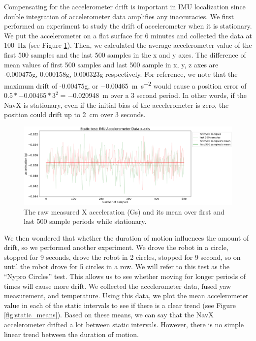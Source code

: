 \documentclass{article}
\begin{document}
      Compensating for the accelerometer drift is important in IMU localization since double integration of accelerometer data amplifies any inaccuracies. We first performed an experiment to study the drift of accelerometer when it is stationary. We put the accelerometer on a flat surface for 6 minutes and collected the data at \SI{100}{\hertz} (see Figure \ref{fig:static_test}). Then, we calculated the average accelerometer value of the first 500 samples and the last 500 samples in the x and y axes. The difference of mean values of first 500 samples and last 500 sample in x, y, z axes are -0.000475g, 0.000158g, 0.000323g respectively. For reference, we note that the maximum drift of -0.00475g, or \SI{-0.00465}{\meter\per\second\squared} would cause a position error of $0.5*-0.00465*3^2=$\SI{-0.020948}{\meter} over a 3 second period. In other words, if the NavX is stationary, even if the initial bias of the accelerometer is zero, the position could drift up to \SI{2}{\centi\meter} over 3 seconds.

      \begin{figure}[H]
        \centering
        \includegraphics[width=1\linewidth]{./images/static_test.png}
        \caption{The raw measured X acceleration (Gs) and its mean over first and last 500 sample periods while stationary.}
        \label{fig:static_test}
      \end{figure}

      We then wondered that whether the duration of motion influences the amount of drift, so we performed another experiment. We drove the robot in a circle, stopped for 9 seconds, drove the robot in 2 circles, stopped for 9 second, so on until the robot drove for 5 circles in a row. We will refer to this test as the ``Nypro Circles'' test. This allows us to see whether moving for longer periods of times will cause more drift. We collected the accelerometer data, fused yaw measurement, and temperature. Using this data, we plot the mean accelerometer value in each of the static intervals to see if there is a clear trend (see Figure \ref{fig:static_means}). Based on these means, we can say that the NavX accelerometer drifted a lot between static intervals. However, there is no simple linear trend between the duration of motion.
\end{document}

